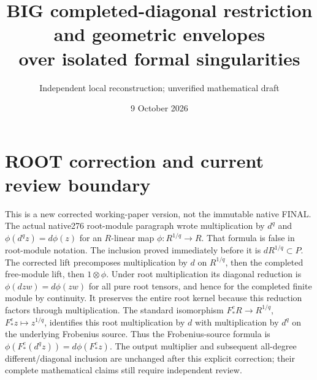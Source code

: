 \documentclass[11pt]{article}
\title{BIG completed-diagonal restriction and geometric envelopes\\over isolated formal singularities}
\author{Independent local reconstruction; unverified mathematical draft}
\date{9 October 2026}
\begin{document}
\maketitle

\section*{ROOT correction and current review boundary}
This is a new corrected working-paper version, not the immutable native
FINAL. The actual native276 root-module paragraph wrote multiplication
by $d^q$ and $\phi(d^q z)=d\phi(z)$ for an $R$-linear map
$\phi:R^{1/q}\to R$. That formula is false in root-module notation.
The inclusion proved immediately before it is $dR^{1/q}\subset P$.
The corrected lift precomposes multiplication by $d$ on $R^{1/q}$,
then the completed free-module lift, then $1\widehat\otimes\phi$.
Under root multiplication its diagonal reduction is
$\phi(dzw)=d\phi(zw)$ for all pure root tensors, and hence for the
completed finite module by continuity. It preserves the entire root
kernel because this reduction factors through multiplication.
The standard isomorphism $F_*^eR\to R^{1/q}$, $F_*^ez\mapsto z^{1/q}$,
identifies this root multiplication by $d$ with multiplication by
$d^q$ on the underlying Frobenius source. Thus the Frobenius-source
formula is $\phi(F_*^e(d^q z))=d\phi(F_*^ez)$.
The output multiplier and subsequent all-degree different/diagonal
inclusion are unchanged after this explicit correction; their complete
mathematical claims still require independent review.
\end{document}
